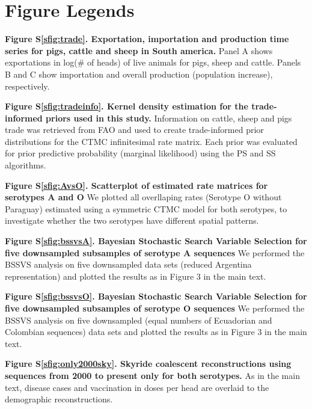 \documentclass[a4paper,10pt]{article}
\begin{document}
\section*{Figure Legends}
\textbf{Figure S\ref{sfig:trade}. Exportation, importation and production time series for pigs, cattle and sheep in South america.} Panel A shows exportations in log(\# of heads) of live animals for pigs, sheep and cattle.
Panels B and C show importation and overall production (population increase), respectively.

\textbf{Figure S\ref{sfig:tradeinfo}. Kernel density estimation for the trade-informed priors used in this study.} Information on cattle, sheep and pigs trade was retrieved from FAO and used to create trade-informed prior distributions for the CTMC infinitesimal rate matrix.
Each prior was evaluated for prior predictive probability (marginal likelihood) using the PS and SS algorithms. 

\textbf{Figure S\ref{sfig:AvsO}. Scatterplot of estimated rate matrices for serotypes A and O} We plotted all overllaping rates (Serotype O without Paraguay) estimated using a symmetric CTMC model for both serotypes, to investigate whether the two serotypes have different spatial patterns.

\textbf{Figure S\ref{sfig:bssvsA}. Bayesian Stochastic Search Variable Selection for five downsampled subsamples of serotype A sequences} We performed the BSSVS analysis on five downsampled data sets (reduced Argentina representation) and plotted the results as in Figure 3 in the main text.

\textbf{Figure S\ref{sfig:bssvsO}. Bayesian Stochastic Search Variable Selection for five downsampled subsamples of serotype O sequences} We performed the BSSVS analysis on five downsampled (equal numbers of Ecuadorian and Colombian sequences) data sets and plotted the results as in Figure 3 in the main text.

\textbf{Figure S\ref{sfig:only2000sky}. Skyride coalescent reconstructions using sequences from 2000 to present only for both serotypes.}
As in the main text, disease cases and vaccination in doses per head are overlaid to the demographic reconstructions.
\end{document}
